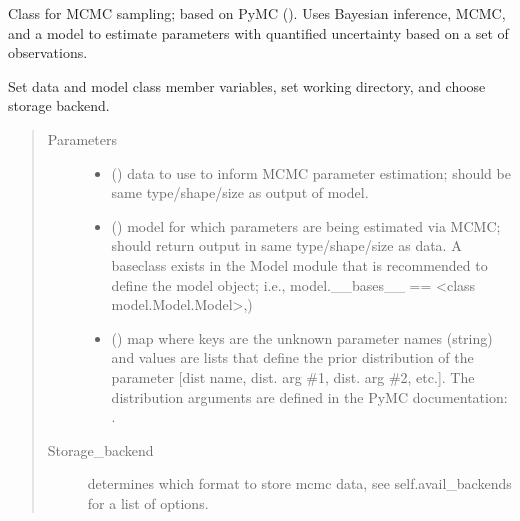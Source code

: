 \documentclass[letterpaper,10pt,english]{sphinxmanual}
\begin{document}
\begin{fulllineitems}
\label{\detokenize{source_code:smcpy.mcmc.mcmc_sampler.MCMCSampler}}
Class for MCMC sampling; based on PyMC ().
Uses Bayesian inference, MCMC, and a model to estimate parameters with
quantified uncertainty based on a set of observations.

Set data and model class member variables, set working directory,
and choose storage backend.
\begin{quote}\begin{description}
\item[{Parameters}] \leavevmode\begin{itemize}
\item {} 
 () \textendash{} data to use to inform MCMC parameter estimation;
should be same type/shape/size as output of model.

\item {} 
 () \textendash{} model for which parameters are being estimated via MCMC;
should return output in same type/shape/size as data. A baseclass
exists in the Model module that is recommended to define the model
object; i.e., model.\_\_bases\_\_ == \textless{}class model.Model.Model\textgreater{},)

\item {} 
 () \textendash{} map where keys are the unknown parameter 
names (string) and values are lists that define the prior
distribution of the parameter {[}dist name, dist. arg \#1, dist. arg
\#2, etc.{]}. The distribution arguments are defined in the PyMC
documentation: .

\end{itemize}

\item[{Storage\_backend}] \leavevmode
determines which format to store mcmc data,
see self.avail\_backends for a list of options.


\end{description}
\end{quote}
\end{fulllineitems}
\end{document}
